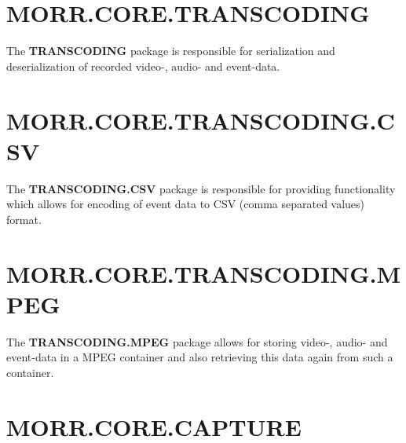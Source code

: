 \section*{MORR.CORE.TRANSCODING}

The \textbf{TRANSCODING} package is responsible for serialization and deserialization of recorded video-, audio- and event-data. 

\begin{packif}
\end{packif}

\begin{packclass}
\end{packclass}

\begin{packpack}
\end{packpack}

\section*{MORR.CORE.TRANSCODING.CSV}
The \textbf{TRANSCODING.CSV} package is responsible for providing functionality which allows for encoding of event data to CSV (comma separated values) format.

\begin{packclass}
\end{packclass}

\section*{MORR.CORE.TRANSCODING.MPEG}
The \textbf{TRANSCODING.MPEG} package allows for storing video-, audio- and event-data in a MPEG container and also retrieving this data again from such a container.

\begin{packclass}
\end{packclass}

\section*{MORR.CORE.CAPTURE}

